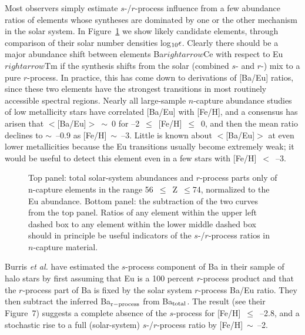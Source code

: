                                                                                                                                                                                                                                                                                                                                                                                                                                                                                                                                                                                                                                                                                                                                                                                                                                                                                                                                                                                                                                                                                                                                                                                                                                                                                                                                                                                                                                                                                                                                                                                                                                                                                                                                                                                                                                                                                                                                                                                                                                                                                                                                                                                                                                                                                                                                                                                                                                                                                                                                                                                                                                                                                                                                                                                                                                                                                                                                                                                                                                                                                                                                                                                                                                                                                                                                                                                                                                                                                                                                                                                                                                                                                                                                                                                                                                                                                                                                                                                                                                                                                                                                                                                                                                                                                                                                                                                                                                                                                                                                                                                                                                                                                                                                                                                                                                                                                                                                                                                                                                                                                                                                                                                                                                                                                                                                                                                                                                                                                                                                                                                                                                                                                                                                                                                                                                                                                                                                                                                                                                                                                                                                                                                                                                                                                                                                                                                                                                                                                                                                                                                                                                                                                                                                                                                                                                                                                                                                                                                                                                                                                                                                                                                                                                                                                                                                                                                                                                                                                                                                                                                                                                                                                                                                                                                                                                                                                                                                                                                                                                                                                                                                                                                                                                                                                                                                                                                                                                                                                                                                                                                                                                                                                                                                                                                                                                                                                                                                                                                                                                                                                                                                                                                                                                                                                                                                                                                                                                                                                                                                                                                                                                                                                                                                                                                                                                                                                                                                                                                                                                                                                                                                                                                                                                                                                                                                                                                                                                                                                                                                                                                                                                                                                                                                                                                                                                                                                                                                                                                                                                                                                                                                                                                                                                                                                                                                                                                                                                                                                                                                                                                                                                                                                                                                                                                                                                                                                                                                                                                                                                                                                                                                                                                                                                                                                                                                                                                                                                                                                                                                                                                                                                                                                                                                                                                                                                                                                                                                                                                                                                                                                                                                                                                                                                                                                                                                                                                                                                                                                                                                                                                                                                                                                                                                                                                                                                                                                                                                                                                                                                                                                                                                                                                                                                                                                                                                                                                                                                                                                                                                                                                                                                                                                                                                                                                                                                                                                                                                                                                                                                                                                                                                                                                                                                                                                                                                                                                                                                                                                                                                                                                                                                                                                                                                                                                            \documentclass{ws-p8-50x6-00}
\begin{document}
Most observers simply estimate $s$-/$r$-process influence from a few 
abundance ratios of elements whose syntheses are dominated by one or the 
other mechanism in the solar system.  
In Figure~\ref{rs2} we show likely candidate elements, through 
comparison of their solar number densities log$_{\rm 10}\epsilon$. 
Clearly there should be a major abundance shift between elements
Ba$rightarrow$Ce with respect to Eu$rightarrow$Tm if the 
synthesis shifts
from the solar (combined $s$- and $r$-) mix to a pure $r$-process.  
In practice, this has come down to derivations of [Ba/Eu] ratios, since 
these two elements have the strongest transitions in most routinely 
accessible spectral regions.  
Nearly all large-sample $n$-capture abundance studies of low metallicity 
stars have correlated [Ba/Eu] with [Fe/H], and a consensus has arisen 
that $<$[Ba/Eu]$>$~$\sim$~0 for --2~$\leq$~[\rm {Fe/H}]~$\leq$~0, 
and then the mean ratio declines to $\sim$~--0.9 as [Fe/H]~$\sim$~--3.  
Little is known about $<$[Ba/Eu]$>$ at even lower metallicities because
the Eu transitions usually become extremely weak; it would be useful to 
detect this element even in a few stars with [Fe/H]~$<$~--3.
 
\begin{figure}[t]
\epsfxsize=20pc \hspace*{0.5in}
 \caption{Top panel: total solar-system abundances and $r$-process
parts only of n-capture elements in the range 56~$\leq$~Z~$\leq$74, 
normalized to the Eu abundance.
Bottom panel: the subtraction of the two curves from the top panel.
Ratios of any element within the upper left dashed box to any element
within the lower middle dashed box should in principle be useful
indicators of the $s$-/$r$-process ratios in $n$-capture material.
\label{rs2}}
\end{figure}

Burris {\it et al.}\cite{Bu00} have estimated the $s$-process component of
Ba in their sample of halo stars by first assuming that Eu is a 100 percent  
$r$-process product and that the $r$-process part of Ba is fixed by the 
solar system $r$-process Ba/Eu ratio.
They then subtract the inferred Ba$_{\rm r-process}$ from Ba$_{\rm total}$.
The result (see their Figure~7) suggests a complete absence of the 
$s$-process for [Fe/H]~$\leq$~--2.8, and a stochastic rise to a full 
(solar-system) $s$-/$r$-process ratio by [Fe/H]~$\sim$~--2.
\end{document}
